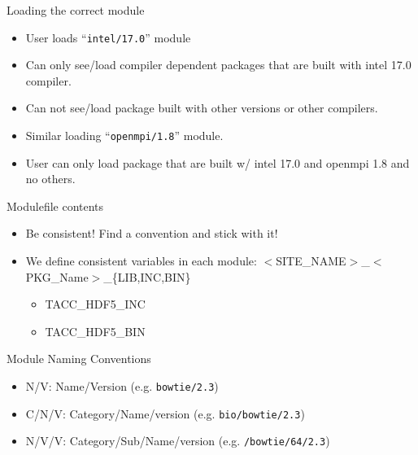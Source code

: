 \documentclass[dvipsnames,aspectratio=169]{beamer}
\begin{document}
\begin{frame}{Loading the correct module}
  \begin{itemize}
    \item User loads ``\texttt{intel/17.0}'' module
    \item Can only see/load compiler dependent packages that are built with
      intel 17.0 compiler.
    \item Can not see/load package built with other versions or other compilers.
    \item Similar loading ``\texttt{openmpi/1.8}'' module.
    \item User can only load package that are built w/ intel 17.0 and
      openmpi 1.8 and no others.
  \end{itemize}
\end{frame}


\begin{frame}{Modulefile contents}
  \begin{itemize}
    \item Be consistent! Find a convention and stick with it!
    \item We define consistent variables in each module:
      $<$SITE\_NAME$>$\_$<$PKG\_Name$>$\_\{LIB,INC,BIN\}
      \begin{itemize}
        \item TACC\_HDF5\_INC
        \item TACC\_HDF5\_BIN
      \end{itemize}
  \end{itemize}
\end{frame}

%

\begin{frame}{Module Naming Conventions}
  \begin{itemize}
    \item N/V:   Name/Version (e.g. \texttt{bowtie/2.3})
    \item C/N/V: Category/Name/version (e.g. \texttt{bio/bowtie/2.3})
    \item N/V/V: Category/Sub/Name/version (e.g. \texttt{/bowtie/64/2.3})
  \end{itemize}
\end{frame}
\end{document}
